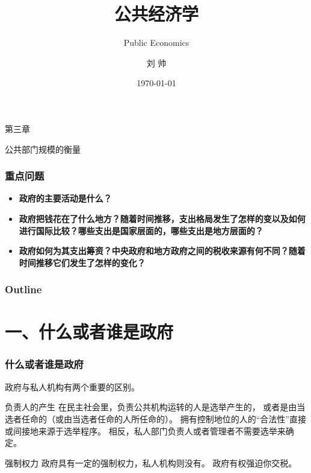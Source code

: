 \documentclass[aspectratio=169, 12pt]{beamer}
\title{公共经济学}
\subtitle{Public Economics}
\author[LIU ShHUAI]{刘 {  } 帅}
\institute{山西师范大学 {  } 经济与管理学院}
\date{\today}
\begin{document}
\maketitle

\begin{frame}[standout]
    第三章\par
    \addtolength{\parskip}{.4em}
    公共部门规模的衡量
\end{frame}

\begin{frame}[plain]
    \frametitle{重点问题}
    \begin{itemize}
        \item \textbf{政府的主要活动是什么？}
        \item \textbf{政府把钱花在了什么地方？随着时间推移，支出格局发生了怎样的变以及如何进行国际比较？哪些支出是国家层面的，哪些支出是地方层面的？}
        \item \textbf{政府如何为其支出筹资？中央政府和地方政府之间的税收来源有何不同？随着时间推移它们发生了怎样的变化？}
    \end{itemize}
\end{frame}

\begin{frame}[plain]
    \frametitle{Outline}
    \tableofcontents[hideallsubsections]
\end{frame}

\section{一、什么或者谁是政府}

\begin{frame}[plain]
    \frametitle{什么或者谁是政府}
    政府与私人机构有两个重要的区别。
    \begin{block}{负责人的产生}
        在民主社会里，负责公共机构运转的人是选举产生的，
        或者是由当选者任命的（或由当选者任命的人所任命的）。
        拥有控制地位的人的“合法性”直接或间接地来源于选举程序。
        相反，私人部门负责人或者管理者不需要选举来确定。
    \end{block}
    \begin{block}{强制权力}
        政府具有一定的强制权力，私人机构则没有。
        政府有权强迫你交税。
    \end{block}
\end{frame}
\end{document}
